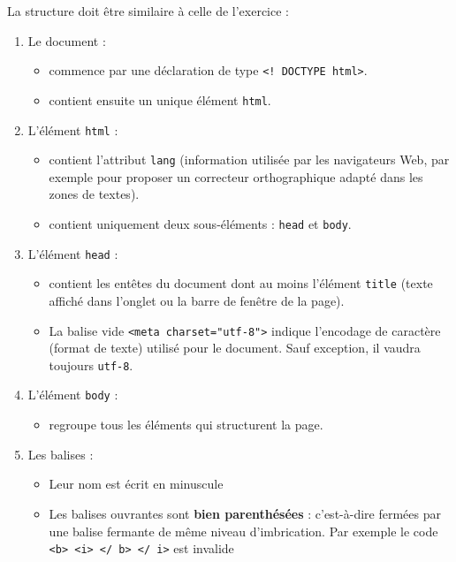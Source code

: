 \documentclass[a4paper,17pt]{extarticle}
\providecommand{\tightlist}{%
      \setlength{\itemsep}{0pt}\setlength{\parskip}{0pt}}
\begin{document}
La structure doit être similaire à celle de l'exercice :

\begin{enumerate}
\def\labelenumi{\arabic{enumi}.}
\tightlist
\item
  Le document :

  \begin{itemize}
  \tightlist
  \item
    commence par une déclaration de type
    \texttt{\textless{}!\ DOCTYPE\ html\textgreater{}}.
  \item
    contient ensuite un unique élément \texttt{html}.
  \end{itemize}
\item
  L'élément \texttt{html} :

  \begin{itemize}
  \tightlist
  \item
    contient l'attribut \texttt{lang} (information utilisée par les
    navigateurs Web, par exemple pour proposer un correcteur
    orthographique adapté dans les zones de textes).
  \item
    contient uniquement deux sous-éléments : \texttt{head} et
    \texttt{body}.
  \end{itemize}
\item
  L'élément \texttt{head} :

  \begin{itemize}
  \tightlist
  \item
    contient les entêtes du document dont au moins l'élément
    \texttt{title} (texte affiché dans l'onglet ou la barre de fenêtre
    de la page).
  \item
    La balise vide
    \texttt{\textless{}meta\ charset="utf-8"\textgreater{}} indique
    l'encodage de caractère (format de texte) utilisé pour le document.
    Sauf exception, il vaudra toujours \texttt{utf-8}.
  \end{itemize}
\item
  L'élément \texttt{body} :

  \begin{itemize}
  \tightlist
  \item
    regroupe tous les éléments qui structurent la page.
  \end{itemize}
\item
  Les balises :

  \begin{itemize}
  \tightlist
  \item
    Leur nom est écrit en minuscule
  \item
    Les balises ouvrantes sont \textbf{bien parenthésées} : c'est-à-dire
    fermées par une balise fermante de même niveau d'imbrication. Par
    exemple le code
    \texttt{\textless{}b\textgreater{}\ \textless{}i\textgreater{}\ \textless{}/\ b\textgreater{}\ \textless{}/\ i\textgreater{}}
    est invalide
  \end{itemize}
\end{enumerate}
\end{document}
